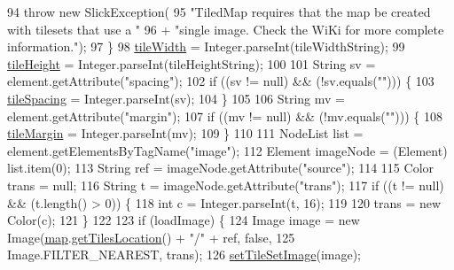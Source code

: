 \begin{DoxyCode}
94             \textcolor{keywordflow}{throw} \textcolor{keyword}{new} SlickException(
95                     \textcolor{stringliteral}{"TiledMap requires that the map be created with tilesets that use a "}
96                             + \textcolor{stringliteral}{"single image.  Check the WiKi for more complete information."});
97         \}
98         \mbox{\hyperlink{classorg_1_1newdawn_1_1slick_1_1tiled_1_1_tile_set_a12995a46982fc8ddc47b517dc500e376}{tileWidth}} = Integer.parseInt(tileWidthString);
99         \mbox{\hyperlink{classorg_1_1newdawn_1_1slick_1_1tiled_1_1_tile_set_aeecbe9c64da988364b3513c4eaa231c2}{tileHeight}} = Integer.parseInt(tileHeightString);
100 
101         String sv = element.getAttribute(\textcolor{stringliteral}{"spacing"});
102         \textcolor{keywordflow}{if} ((sv != null) && (!sv.equals(\textcolor{stringliteral}{""}))) \{
103             \mbox{\hyperlink{classorg_1_1newdawn_1_1slick_1_1tiled_1_1_tile_set_a0f7faa748f39e0211e7d56bb5f1088c8}{tileSpacing}} = Integer.parseInt(sv);
104         \}
105 
106         String mv = element.getAttribute(\textcolor{stringliteral}{"margin"});
107         \textcolor{keywordflow}{if} ((mv != null) && (!mv.equals(\textcolor{stringliteral}{""}))) \{
108             \mbox{\hyperlink{classorg_1_1newdawn_1_1slick_1_1tiled_1_1_tile_set_a2d51fd9dbb8548f1a885f47885ec0a32}{tileMargin}} = Integer.parseInt(mv);
109         \}
110 
111         NodeList list = element.getElementsByTagName(\textcolor{stringliteral}{"image"});
112         Element imageNode = (Element) list.item(0);
113         String ref = imageNode.getAttribute(\textcolor{stringliteral}{"source"});
114 
115         Color trans = null;
116         String t = imageNode.getAttribute(\textcolor{stringliteral}{"trans"});
117         \textcolor{keywordflow}{if} ((t != null) && (t.length() > 0)) \{
118             \textcolor{keywordtype}{int} c = Integer.parseInt(t, 16);
119 
120             trans = \textcolor{keyword}{new} Color(c);
121         \}
122 
123         \textcolor{keywordflow}{if} (loadImage) \{
124             Image image = \textcolor{keyword}{new} Image(\mbox{\hyperlink{classorg_1_1newdawn_1_1slick_1_1tiled_1_1_tile_set_a6d8213553283cc2970748811ec170644}{map}}.\mbox{\hyperlink{classorg_1_1newdawn_1_1slick_1_1tiled_1_1_tiled_map_adecd3ac79ebd72721187e7646d783782}{getTilesLocation}}() + \textcolor{stringliteral}{"/"} + ref, \textcolor{keyword}{false},
125                     Image.FILTER\_NEAREST, trans);
126             \mbox{\hyperlink{classorg_1_1newdawn_1_1slick_1_1tiled_1_1_tile_set_a06c06564f6695455d57a2260b7d1df09}{setTileSetImage}}(image);

\end{DoxyCode}

